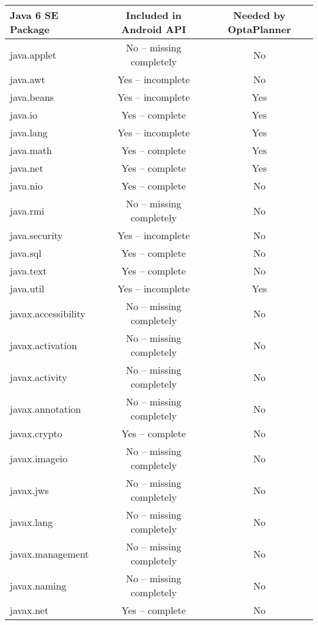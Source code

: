 \begin {table}[h!]
\begin{tabular}{|l|c|c|}
\hline
{\bf Java 6 SE Package} & {\bf Included in Android API} & {\bf Needed by OptaPlanner} \\
\hline \hline
java.applet           & No -- missing completely  & No\\
java.awt              & Yes -- incomplete         & No\\
java.beans            & Yes -- incomplete         & Yes\\
java.io               & Yes -- complete           & Yes\\
java.lang             & Yes -- incomplete         & Yes\\
java.math             & Yes -- complete           & Yes\\
java.net              & Yes -- complete           & Yes\\
java.nio              & Yes -- complete           & No\\
java.rmi              & No -- missing completely  & No\\
java.security         & Yes -- incomplete         & No\\
java.sql              & Yes -- complete           & No\\
java.text             & Yes -- complete           & No\\
java.util             & Yes -- incomplete         & Yes\\
javax.accessibility   & No -- missing completely  & No\\
javax.activation      & No -- missing completely  & No\\
javax.activity        & No -- missing completely  & No\\
javax.annotation      & No -- missing completely  & No\\
javax.crypto          & Yes -- complete           & No\\
javax.imageio         & No -- missing completely  & No\\
javax.jws             & No -- missing completely  & No\\
javax.lang            & No -- missing completely  & No\\
javax.management      & No -- missing completely  & No\\
javax.naming          & No -- missing completely  & No\\
javax.net             & Yes -- complete           & No\\

\end{tabular}
\end{table}
